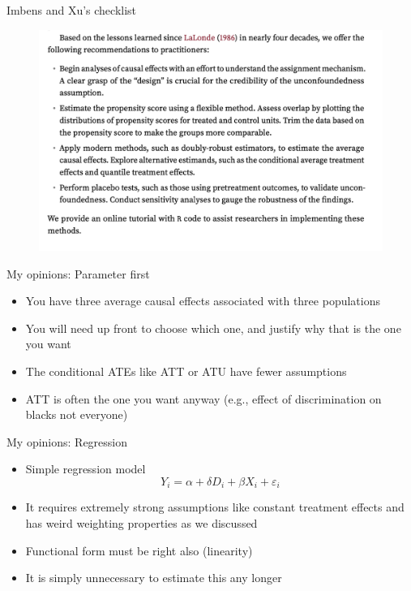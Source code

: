 \documentclass{beamer}
\begin{document}
\begin{frame}{Imbens and Xu's checklist}


  \begin{figure}
    \includegraphics[scale=0.3]{./lecture_includes/imbens_xu_checklist}
  \end{figure}


\end{frame}




\begin{frame}{My opinions: Parameter first}

\begin{itemize}

\item You have three average causal effects associated with three populations
\item You will need up front to choose which one, and justify why that is the one you want
\item The conditional ATEs like ATT or ATU have fewer assumptions
\item ATT is often the one you want anyway (e.g., effect of discrimination on blacks not everyone)
\end{itemize}

\end{frame}

\begin{frame}{My opinions: Regression}

\begin{itemize}
\item Simple regression model $$Y_i = \alpha + \delta D_i + \beta X_i +\varepsilon_i$$
\item It requires extremely strong assumptions like constant treatment effects and has weird weighting properties as we discussed
\item Functional form must be right also (linearity)
\item It is simply unnecessary to estimate this any longer
\end{itemize}

\end{frame}
\end{document}
